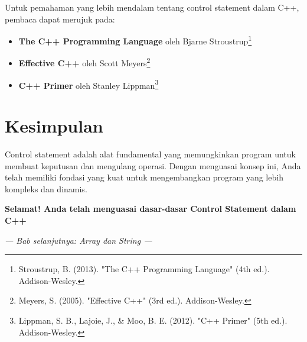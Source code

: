 Untuk pemahaman yang lebih mendalam tentang control statement dalam C++, pembaca dapat merujuk pada:

\begin{itemize}
\item \textbf{The C++ Programming Language} oleh Bjarne Stroustrup\footnote{Stroustrup, B. (2013). "The C++ Programming Language" (4th ed.). Addison-Wesley.}
\item \textbf{Effective C++} oleh Scott Meyers\footnote{Meyers, S. (2005). "Effective C++" (3rd ed.). Addison-Wesley.}
\item \textbf{C++ Primer} oleh Stanley Lippman\footnote{Lippman, S. B., Lajoie, J., \& Moo, B. E. (2012). "C++ Primer" (5th ed.). Addison-Wesley.}
\end{itemize}

\section{Kesimpulan}

Control statement adalah alat fundamental yang memungkinkan program untuk membuat keputusan dan mengulang operasi. Dengan menguasai konsep ini, Anda telah memiliki fondasi yang kuat untuk mengembangkan program yang lebih kompleks dan dinamis.

\begin{center}
\textbf{Selamat! Anda telah menguasai dasar-dasar Control Statement dalam C++}
\end{center}

\vspace{1cm}

\begin{center}
\textit{--- Bab selanjutnya: Array dan String ---}
\end{center}